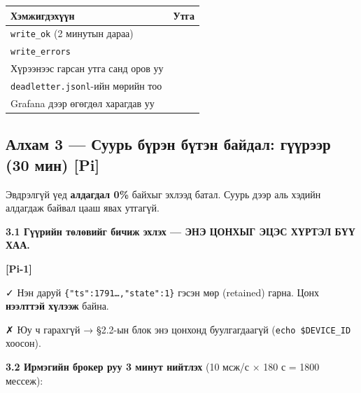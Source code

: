 \begingroup\scriptsize\begin{longtable}[]{@{}ll@{}}
\toprule
Хэмжигдэхүүн & Утга\tabularnewline
\midrule
\endhead
\texttt{write\_ok} (2 минутын дараа) &\tabularnewline
\texttt{write\_errors} &\tabularnewline
Хүрээнээс гарсан утга санд оров уу &\tabularnewline
\texttt{deadletter.jsonl}-ийн мөрийн тоо &\tabularnewline
Grafana дээр өгөгдөл харагдав уу &\tabularnewline
\bottomrule
\end{longtable}\endgroup

\hypertarget{ux430ux43bux445ux430ux43c-3-ux441ux443ux443ux440ux44c-ux431ux4afux440ux44dux43d-ux431ux4afux442ux44dux43d-ux431ux430ux439ux434ux430ux43b-ux433ux4afux4afux440ux44dux44dux440-30-ux43cux438ux43d-pi}{%
\subsection{Алхам 3 --- Суурь бүрэн бүтэн байдал: гүүрээр (30 мин) {[}Pi{]}}\label{ux430ux43bux445ux430ux43c-3-ux441ux443ux443ux440ux44c-ux431ux4afux440ux44dux43d-ux431ux4afux442ux44dux43d-ux431ux430ux439ux434ux430ux43b-ux433ux4afux4afux440ux44dux44dux440-30-ux43cux438ux43d-pi}}

Эвдрэлгүй үед \textbf{алдагдал 0\%} байхыг эхлээд батал. Суурь дээр аль хэдийн алдагдаж байвал цааш явах утгагүй.

\textbf{3.1 Гүүрийн төлөвийг бичиж эхлэх --- ЭНЭ ЦОНХЫГ ЭЦЭС ХҮРТЭЛ БҮҮ ХАА.}

\textbf{{[}Pi-1{]}}

\begin{Shaded}
\begin{Highlighting}[]
 \KeywordTok{\textbackslash{}}
   \StringTok{/}\StringTok{/}\StringTok{/} \KeywordTok{|} 
\end{Highlighting}
\end{Shaded}

✓ Нэн даруй \texttt{\{"ts":\allowbreak{}1791\ldots{},"state":\allowbreak{}1\}} гэсэн мөр (retained) гарна. Цонх \textbf{нээлттэй хүлээж} байна.

✗ Юу ч гарахгүй → §2.2-ын блок энэ цонхонд буулгагдаагүй (\texttt{echo\ \$DEVICE\_\allowbreak{}ID} хоосон).

\textbf{3.2 Ирмэгийн брокер руу 3 минут нийтлэх} (10 мсж/с × 180 с = 1800 мессеж):

